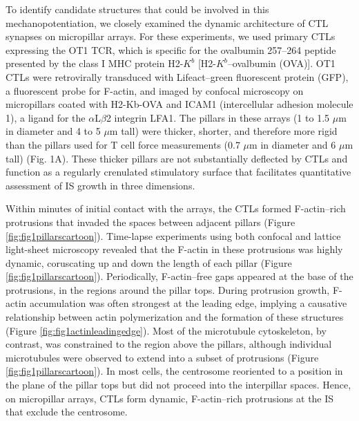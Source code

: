 To identify candidate structures that could be involved in this mechanopotentiation, we closely examined the dynamic architecture of CTL synapses on micropillar arrays. For these experiments, we used primary CTLs expressing the OT1 TCR, which is specific for the ovalbumin 257–264 peptide presented by the class I MHC protein H2-$K^{b}$ [H2-$K^{b}$–ovalbumin (OVA)]. OT1 CTLs were retrovirally transduced with Lifeact–green fluorescent protein (GFP), a fluorescent probe for F-actin, and imaged by confocal microscopy on micropillars coated with H2-Kb-OVA and ICAM1 (intercellular adhesion molecule 1), a ligand for the $\alpha$L$\beta$2 integrin LFA1. The pillars in these arrays (1 to 1.5 $\mu$m in diameter and 4 to 5 $\mu$m tall) were thicker, shorter, and therefore more rigid than the pillars used for T cell force measurements (0.7 $\mu$m in diameter and 6 $\mu$m tall) (Fig. 1A). These thicker pillars are not substantially deflected by CTLs and function as a regularly crenulated stimulatory surface that facilitates quantitative assessment of IS growth in three dimensions.

Within minutes of initial contact with the arrays, the CTLs formed F-actin–rich protrusions that invaded the spaces between adjacent pillars (Figure \ref{fig:fig1pillarscartoon}). Time-lapse experiments using both confocal and lattice light-sheet microscopy revealed that the F-actin in these protrusions was highly dynamic, coruscating up and down the length of each pillar (Figure \ref{fig:fig1pillarscartoon}). Periodically, F-actin–free gaps appeared at the base of the protrusions, in the regions around the pillar tops. During protrusion growth, F-actin accumulation was often strongest at the leading edge, implying a causative relationship between actin polymerization and the formation of these structures (Figure \ref{fig:fig1actinleadingedge}). Most of the microtubule cytoskeleton, by contrast, was constrained to the region above the pillars, although individual microtubules were observed to extend into a subset of protrusions (Figure \ref{fig:fig1pillarscartoon}). In most cells, the centrosome reoriented to a position in the plane of the pillar tops but did not proceed into the interpillar spaces. Hence, on micropillar arrays, CTLs form dynamic, F-actin–rich protrusions at the IS that exclude the centrosome.

